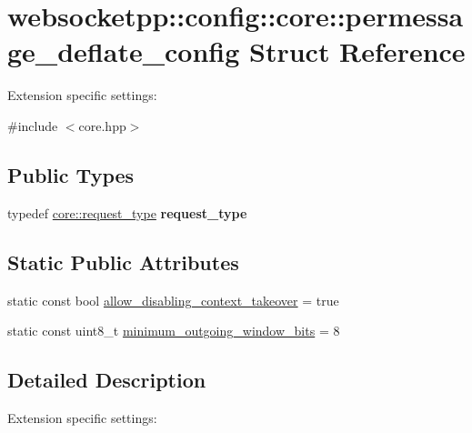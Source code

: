 \hypertarget{structwebsocketpp_1_1config_1_1core_1_1permessage__deflate__config}{}\section{websocketpp\+:\+:config\+:\+:core\+:\+:permessage\+\_\+deflate\+\_\+config Struct Reference}
\label{structwebsocketpp_1_1config_1_1core_1_1permessage__deflate__config}


Extension specific settings\+:  




{\ttfamily \#include $<$core.\+hpp$>$}

\subsection*{Public Types}
\begin{DoxyCompactItemize}
\item 
\mbox{\label{structwebsocketpp_1_1config_1_1core_1_1permessage__deflate__config_aba198d4d1a05699588fb13335b57b38c}} 
typedef \mbox{\hyperlink{classwebsocketpp_1_1http_1_1parser_1_1request}{core\+::request\+\_\+type}} {\bfseries request\+\_\+type}
\end{DoxyCompactItemize}
\subsection*{Static Public Attributes}
\begin{DoxyCompactItemize}
\item 
static const bool \mbox{\hyperlink{structwebsocketpp_1_1config_1_1core_1_1permessage__deflate__config_ac9b85348637f891c2965e15532a7018e}{allow\+\_\+disabling\+\_\+context\+\_\+takeover}} = true
\item 
static const uint8\+\_\+t \mbox{\hyperlink{structwebsocketpp_1_1config_1_1core_1_1permessage__deflate__config_aa43d8526e2b89349b3fd9a5372507594}{minimum\+\_\+outgoing\+\_\+window\+\_\+bits}} = 8
\end{DoxyCompactItemize}


\subsection{Detailed Description}
Extension specific settings\+: 

